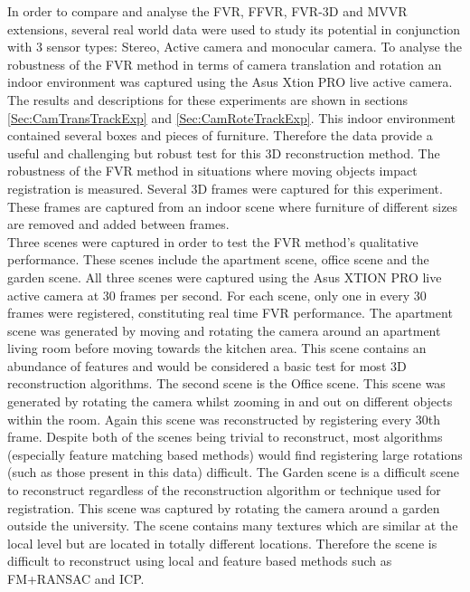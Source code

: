
In order to compare and analyse the FVR, FFVR, FVR-3D and MVVR extensions, several real world data were used to study its potential in conjunction with 3 sensor types: Stereo, Active camera and monocular camera. To analyse the robustness of the FVR method in terms of camera translation and rotation an indoor environment was captured using the Asus Xtion PRO live active camera. The results and descriptions for these experiments are shown in sections \ref{Sec:CamTransTrackExp} and \ref{Sec:CamRoteTrackExp}. This indoor environment contained several boxes and pieces of furniture. Therefore the data provide a useful and challenging but robust test for this 3D reconstruction method. The robustness of the FVR method in situations where moving objects impact registration is measured. Several 3D frames were captured for this experiment. These frames are captured from an indoor scene where furniture of different sizes are removed and added between frames. \\

Three scenes were captured in order to test the FVR method's qualitative performance. These scenes include the apartment scene, office scene and the garden scene. All three scenes were captured using the Asus XTION PRO live active camera at 30 frames per second. For each scene, only one in every 30 frames were registered, constituting real time FVR performance. The apartment scene was generated by moving and rotating the camera around an apartment living room before moving towards the kitchen area. This scene contains an abundance of features and would be considered a basic test for most 3D reconstruction algorithms. The second scene is the Office scene. This scene was generated by rotating the camera whilst zooming in and out on different objects within the room. Again this scene was reconstructed by registering every 30th frame. Despite both of the scenes being trivial to reconstruct, most algorithms (especially feature matching based methods) would find registering large rotations (such as those present in this data) difficult. The Garden scene is a difficult scene to reconstruct regardless of the reconstruction algorithm or technique used for registration. This scene was captured by rotating the camera around a garden outside the university. The scene contains many textures which are similar at the local level but are located in totally different locations. Therefore the scene is difficult to reconstruct using local and feature based methods such as FM+RANSAC and ICP. \\

